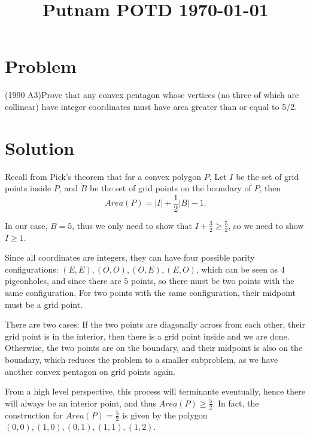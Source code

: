 \documentclass[amssymb,pra,12pt,aps,notitlepage]{revtex4-1}
\begin{document}
\title{Putnam POTD \today}
\maketitle

\section{Problem}
(1990 A3)Prove that any convex pentagon whose vertices (no three of
which are collinear) have integer coordinates must have area greater than
or equal to 5/2.

\section{Solution}

Recall from Pick's theorem that for a convex polygon $P$, 
Let $I$ be the set of grid points inside $P$, and $B$ be the 
set of grid points on the boundary of $P$, then 
\[Area(P) = \left|I\right| + \frac{1}{2} \left|B\right| - 1.\]

In our case, $B = 5$, thus we only need to show that 
$I + \frac{3}{2} \ge \frac{5}{2}$, so 
we need to show $I \ge 1$. 

Since all coordinates are integers, they can have four possible parity \\
configurations:
$(E,E),(O,O),(O,E),(E,O)$, which can be seen as 
4 pigeonholes, and since there are 
 $5$ points, so there must be two points with the same configuration. 
For two points with the same configuration, their midpoint must be a grid point. 

There are two cases: If the two points are diagonally across from each other,
their grid point is in the interior, 
then there is a grid point inside and we are done. \\Otherwise, the two points 
are on the boundary, and their midpoint is also on the boundary,
which reduces the problem to a smaller subproblem, as 
we have another convex pentagon on grid points again. 

From a high level perspective, this process will terminante eventually,
hence there will always be an interior point, and thus 
$Area(P) \ge \frac{5}{2}$. In fact, the construction for 
$Area(P) = \frac{5}{2}$ is given by 
the polygon $(0,0),(1,0),(0,1),(1,1),(1,2)$. 
\end{document}
